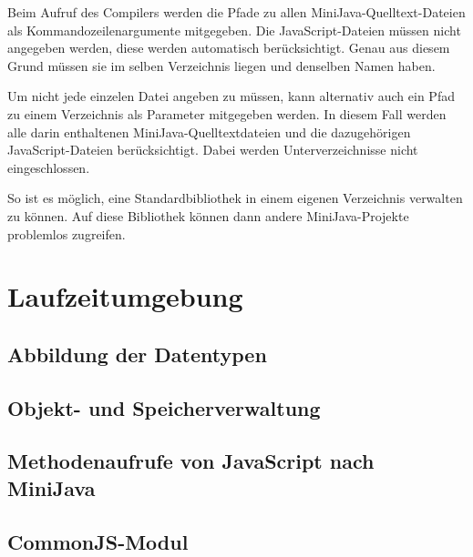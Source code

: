 Beim Aufruf des Compilers werden die Pfade zu allen MiniJava-Quelltext-Dateien als Kommandozeilenargumente mitgegeben. Die JavaScript-Dateien müssen nicht angegeben werden, diese werden automatisch berücksichtigt. Genau aus diesem Grund müssen sie im selben Verzeichnis liegen und denselben Namen haben.

Um nicht jede einzelen Datei angeben zu müssen, kann alternativ auch ein Pfad zu einem Verzeichnis als Parameter mitgegeben werden. In diesem Fall werden alle darin enthaltenen MiniJava-Quelltextdateien und die dazugehörigen JavaScript-Dateien berücksichtigt. Dabei werden Unterverzeichnisse nicht eingeschlossen.

So ist es möglich, eine Standardbibliothek in einem eigenen Verzeichnis verwalten zu können. Auf diese Bibliothek können dann andere MiniJava-Projekte problemlos zugreifen.

\section{Laufzeitumgebung}
\subsection{Abbildung der Datentypen}
\subsection{Objekt- und Speicherverwaltung}
\subsection{Methodenaufrufe von JavaScript nach MiniJava}
\subsection{CommonJS-Modul}
